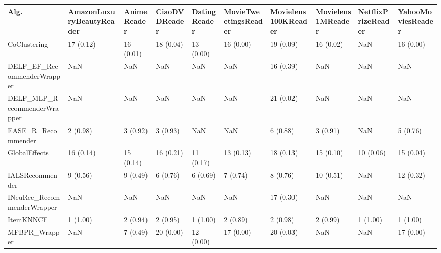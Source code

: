 \begin{tabular}{llllllllll}
\toprule
                               Alg. & AmazonLuxuryBeautyReader & AnimeReader & CiaoDVDReader & DatingReader & MovieTweetingsReader & Movielens100KReader & Movielens1MReader & NetflixPrizeReader & YahooMoviesReader \\
\midrule
                       CoClustering &                17 (0.12) &   16 (0.01) &     18 (0.04) &    13 (0.00) &            16 (0.00) &           19 (0.09) &         16 (0.02) &                NaN &         16 (0.00) \\
         DELF\_EF\_RecommenderWrapper &                      NaN &         NaN &           NaN &          NaN &                  NaN &           16 (0.39) &               NaN &                NaN &               NaN \\
        DELF\_MLP\_RecommenderWrapper &                      NaN &         NaN &           NaN &          NaN &                  NaN &           21 (0.02) &               NaN &                NaN &               NaN \\
                 EASE\_R\_Recommender &                 2 (0.98) &    3 (0.92) &      3 (0.93) &          NaN &                  NaN &            6 (0.88) &          3 (0.91) &                NaN &          5 (0.76) \\
                      GlobalEffects &                16 (0.14) &   15 (0.14) &     16 (0.21) &    11 (0.17) &            13 (0.13) &           18 (0.13) &         15 (0.10) &          10 (0.06) &         15 (0.04) \\
                    IALSRecommender &                 9 (0.56) &    9 (0.49) &      6 (0.76) &     6 (0.69) &             7 (0.74) &            8 (0.76) &         10 (0.51) &                NaN &         12 (0.32) \\
         INeuRec\_RecommenderWrapper &                      NaN &         NaN &           NaN &          NaN &                  NaN &           17 (0.30) &               NaN &                NaN &               NaN \\
                          ItemKNNCF &                 1 (1.00) &    2 (0.94) &      2 (0.95) &     1 (1.00) &             2 (0.89) &            2 (0.98) &          2 (0.99) &           1 (1.00) &          1 (1.00) \\
                      MFBPR\_Wrapper &                      NaN &    7 (0.49) &     20 (0.00) &    12 (0.00) &            17 (0.00) &           20 (0.03) &               NaN &                NaN &         17 (0.00) \\

\end{tabular}
